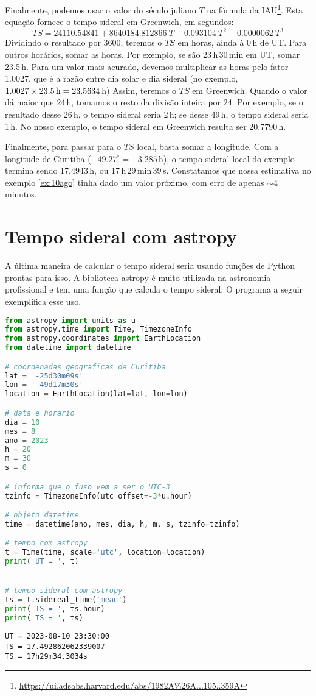 Finalmente, podemos usar o valor do século juliano $T$ na fórmula da IAU\footnote{\url{https://ui.adsabs.harvard.edu/abs/1982A\%26A...105..359A}}. Esta equação fornece o tempo sideral em Greenwich, em segundos:
%
\begin{equation}
TS = 24110.54841 + 8640184.812866~T + 0.093104~T^2 - 0.0000062~T^3
\end{equation}
%
Dividindo o resultado por 3600, teremos o $TS$ em horas, ainda à 0\,h de UT. Para outros horários, somar as horas. Por exemplo, se são 23\,h\,30\,min em UT, somar 23.5\,h. Para um valor mais acurado, devemos multiplicar as horas pelo fator 1.0027, que é a razão entre dia solar e dia sideral (no exemplo, $1.0027 \times 23.5\,{\rm h} = 23.5634$\,h) Assim, teremos o $TS$ em Greenwich. Quando o valor dá maior que 24\,h, tomamos o resto da divisão inteira por 24. Por exemplo, se o resultado desse 26\,h, o tempo sideral seria 2\,h; se desse 49\,h, o tempo sideral seria 1\,h. No nosso exemplo, o tempo sideral em Greenwich resulta ser 20.7790\,h.

Finalmente, para passar para o $TS$ local, basta somar a longitude. Com a longitude de Curitiba ($-49.27^{\circ} = -3.285$\,h), o tempo sideral local do exemplo termina sendo 17.4943\,h, ou 17\,h\,29\,min\,39\,s. Constatamos que nossa estimativa no exemplo \ref{ex:10ago} tinha dado um valor próximo, com erro de apenas $\sim$4 minutos.

\section{Tempo sideral com astropy}
\label{sec:ts4}

A última maneira de calcular o tempo sideral seria usando funções de Python prontas para isso. A biblioteca astropy é muito utilizada na astronomia profissional e tem uma função que calcula o tempo sideral. O programa a seguir exemplifica esse uso.

\begin{lstlisting}[language=Python]
from astropy import units as u
from astropy.time import Time, TimezoneInfo
from astropy.coordinates import EarthLocation
from datetime import datetime

# coordenadas geograficas de Curitiba
lat = '-25d30m09s'
lon = '-49d17m30s'
location = EarthLocation(lat=lat, lon=lon)

# data e horario
dia = 10
mes = 8
ano = 2023
h = 20
m = 30
s = 0

# informa que o fuso vem a ser o UTC-3
tzinfo = TimezoneInfo(utc_offset=-3*u.hour)

# objeto datetime
time = datetime(ano, mes, dia, h, m, s, tzinfo=tzinfo)

# tempo com astropy
t = Time(time, scale='utc', location=location)
print('UT = ', t)


# tempo sideral com astropy
ts = t.sidereal_time('mean')
print('TS = ', ts.hour)
print('TS = ', ts)

\end{lstlisting}
\noindent\texttt{UT =  2023-08-10 23:30:00}\\
\noindent\texttt{TS =  17.492862062339007}\\
\noindent\texttt{TS =  17h29m34.3034s}\\


